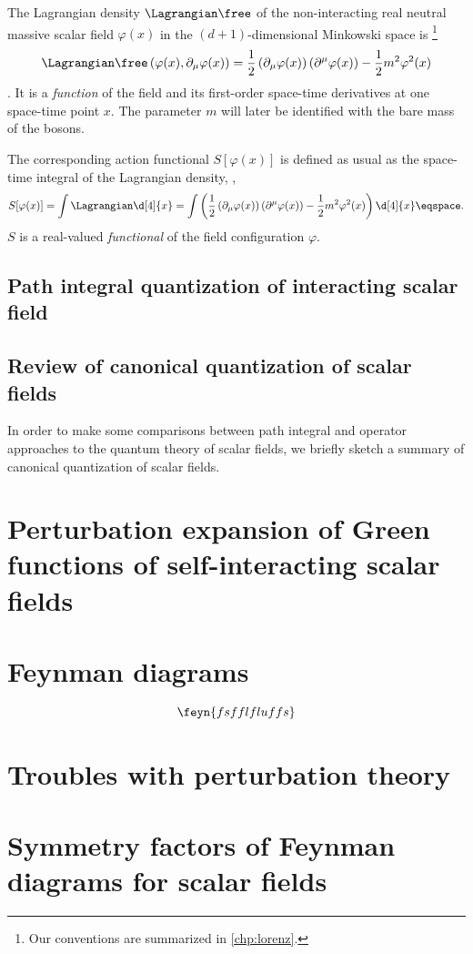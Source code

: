 The Lagrangian density $\Lagrangian\free$ of the non-interacting real neutral massive scalar field
$\varphi(x)$ in the $(d+1)$-dimensional Minkowski space is%
\footnote{Our conventions are summarized in \cref{chp:lorenz}.}
\begin{dmath}[label={L0scalar}]
   \Lagrangian\free \left( \varphi(x), \partial_{\mu}\varphi(x) \right) = \frac{1}{2} \left( \partial_{\mu} \varphi(x) \right) \left(
\partial^{\mu} \varphi(x) \right) - \frac{1}{2} m^{2} \varphi^{2}(x) 
\end{dmath}.
It is a \emph{function} of the field and its first-order space-time
derivatives at one space-time point $x$.
The parameter $m$ will later be identified with the bare mass of the bosons.

The corresponding action functional $S[\varphi(x)]$ is defined as usual as the space-time integral of the
Lagrangian density, \ie, 
\begin{equation}\label{eq:S}
S[\varphi(x)] = \int \Lagrangian \d[4]{x} = 
\int \left( \frac{1}{2} \left( \partial_{\mu} \varphi(x) \right) \left(
\partial^{\mu} \varphi(x) \right) - \frac{1}{2}m^{2} \varphi^{2}(x) \right)
\d[4]{x} \eqspace .
\end{equation}
$S$ is a real-valued \emph{functional} of the field configuration $\varphi$.



\subsection{Path integral quantization of interacting scalar field}
\subsection{Review of canonical quantization of scalar fields}

In order to make some comparisons between path integral and operator approaches
to the quantum theory of scalar fields, we briefly sketch a summary of canonical
quantization of scalar fields.


\section{Perturbation expansion of Green functions of self-interacting scalar fields}
\section{Feynman diagrams}

\begin{dmath}
   \feyn{fs f fl flu f fs}
\end{dmath}

\section{Troubles with perturbation theory}

\section{Symmetry factors of Feynman diagrams for scalar fields}

